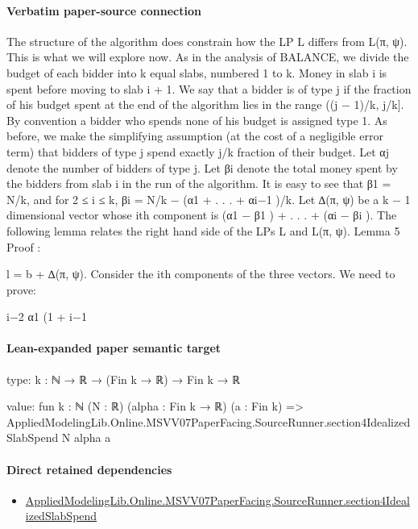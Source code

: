\documentclass[10pt]{article}
\begin{document}
\paragraph{Verbatim paper-source connection}
\begin{ReviewVerbatim}
The structure of the algorithm does constrain how the LP L differs from L(π, ψ). This is what
we will explore now.
As in the analysis of BALANCE, we divide the budget of each bidder into k equal slabs,
numbered 1 to k. Money in slab i is spent before moving to slab i + 1. We say that a bidder
is of type j if the fraction of his budget spent at the end of the algorithm lies in the range
((j − 1)/k, j/k]. By convention a bidder who spends none of his budget is assigned type 1. As
before, we make the simplifying assumption (at the cost of a negligible error term) that bidders
of type j spend exactly j/k fraction of their budget. Let αj denote the number of bidders of
type j. Let βi denote the total money spent by the bidders from slab i in the run of the
algorithm. It is easy to see that β1 = N/k, and for 2 ≤ i ≤ k, βi = N/k − (α1 + . . . + αi−1 )/k.
Let ∆(π, ψ) be a k − 1 dimensional vector whose ith component is (α1 − β1 ) + . . . + (αi − βi ).
The following lemma relates the right hand side of the LPs L and L(π, ψ).
Lemma 5
Proof :

l = b + ∆(π, ψ).
Consider the ith components of the three vectors. We need to prove:

i−2
α1 (1 + i−1
\end{ReviewVerbatim}



\paragraph{Lean-expanded paper semantic target}
\begin{ReviewVerbatim}
type:
{k : ℕ} → ℝ → (Fin k → ℝ) → Fin k → ℝ

value:
fun {k : ℕ} (N : ℝ) (alpha : Fin k → ℝ) (a : Fin k) =>
  AppliedModelingLib.Online.MSVV07PaperFacing.SourceRunner.section4IdealizedSlabSpend N alpha a
\end{ReviewVerbatim}

\paragraph{Direct retained dependencies}
\begin{itemize}\raggedright
\item \hyperlink{governing-declaration-551dcb1f40ef38c5}{Applied\allowbreak{}Modeling\allowbreak{}Lib.\allowbreak{}Online.\allowbreak{}MSVV07\allowbreak{}Paper\allowbreak{}Facing.\allowbreak{}Source\allowbreak{}Runner.\allowbreak{}section4\allowbreak{}Idealized\allowbreak{}Slab\allowbreak{}Spend}
\end{itemize}
\end{document}
